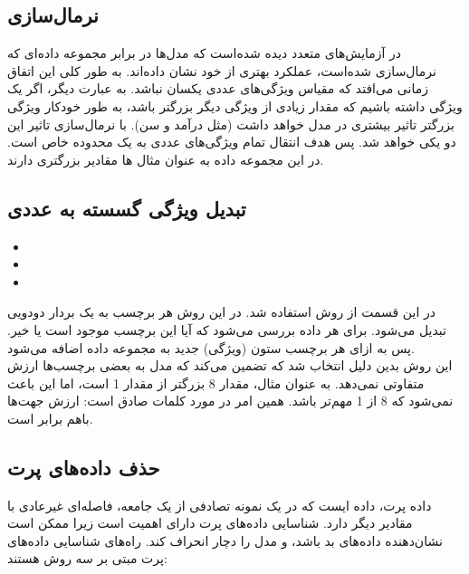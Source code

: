 \documentclass{article}
\begin{document}
\subsection{نرمال‌سازی}
در آزمایش‌های متعدد دیده شده‌است که مدل‌ها در برابر مجموعه داده‌ای که نرمال‌سازی شده‌است، عملکرد بهتری از خود نشان داده‌اند. به طور کلی این اتفاق زمانی می‌افتد که مقیاس ویژگی‌های عددی یکسان نباشد. به عبارت دیگر، اگر یک ویژگی داشته باشیم که مقدار زیادی از ویژگی دیگر بزرگتر باشد، به طور خودکار ویژگی بزرگتر تاثیر بیشتری در مدل خواهد داشت (مثل درآمد و سن). با نرمال‌سازی تاثیر این دو یکی خواهد شد. پس هدف انتقال تمام ویژگی‌های عددی به یک محدوده خاص است. در این مجموعه داده به عنوان مثال  ها مقادیر بزرگتری دارند.

\subsection{تبدیل ویژگی گسسته به عددی}
\begin{itemize}
    \item {}
    \item {}
    \item {}
\end{itemize}
در این قسمت از روش  استفاده شد. در این روش هر برچسب به یک بردار دودویی تبدیل می‌شود. برای هر داده بررسی می‌شود که آیا این برچسب موجود است یا خیر. پس به ازای هر برچسب ستون (ویژگی) جدید به مجموعه داده اضافه می‌شود.
\\
این روش بدین دلیل انتخاب شد که تضمین می‌کند که مدل به بعضی برچسب‌ها ارزش متفاوتی نمی‌دهد. به عنوان مثال، مقدار 8 بزرگتر از مقدار 1 است، اما این باعث نمی‌شود که 8 از 1 مهم‌تر باشد. همین امر در مورد کلمات صادق است: ارزش جهت‌ها باهم برابر است.


\subsection{حذف داده‌های پرت}

داده پرت، داده ایست که در یک نمونه تصادفی از یک جامعه، فاصله‌ای غیرعادی با مقادیر دیگر دارد. شناسایی داده‌های پرت دارای اهمیت است زیرا ممکن است نشان‌دهنده داده‌های بد باشد، و مدل را دچار انحراف کند. راه‌های شناسایی داده‌های پرت مبتی بر سه روش هستند:
\end{document}
